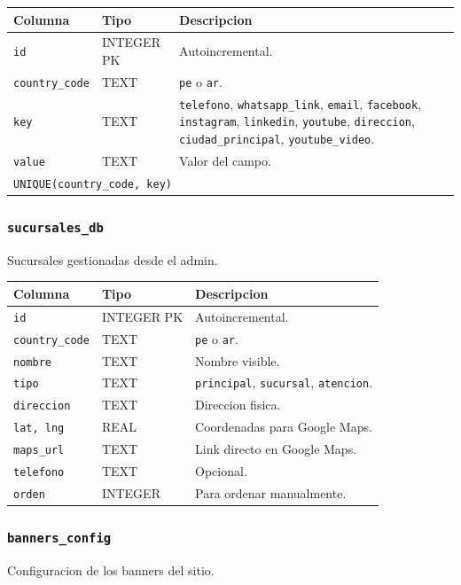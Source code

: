 \documentclass[11pt,a4paper]{article}
\begin{document}
\begin{longtable}{p{3.5cm} p{2cm} p{8cm}}
\toprule
\textbf{Columna} & \textbf{Tipo} & \textbf{Descripcion} \\
\midrule
\endhead
\texttt{id}            & INTEGER PK & Autoincremental. \\
\texttt{country\_code} & TEXT       & \texttt{pe} o \texttt{ar}. \\
\texttt{key}           & TEXT       & \texttt{telefono}, \texttt{whatsapp\_link}, \texttt{email}, \texttt{facebook}, \texttt{instagram}, \texttt{linkedin}, \texttt{youtube}, \texttt{direccion}, \texttt{ciudad\_principal}, \texttt{youtube\_video}. \\
\texttt{value}         & TEXT       & Valor del campo. \\
\multicolumn{3}{l}{\texttt{UNIQUE(country\_code, key)}} \\
\bottomrule
\end{longtable}

\subsubsection{\texttt{sucursales\_db}}
Sucursales gestionadas desde el admin.

\begin{longtable}{p{3.5cm} p{2cm} p{8cm}}
\toprule
\textbf{Columna} & \textbf{Tipo} & \textbf{Descripcion} \\
\midrule
\endhead
\texttt{id}            & INTEGER PK & Autoincremental. \\
\texttt{country\_code} & TEXT       & \texttt{pe} o \texttt{ar}. \\
\texttt{nombre}        & TEXT       & Nombre visible. \\
\texttt{tipo}          & TEXT       & \texttt{principal}, \texttt{sucursal}, \texttt{atencion}. \\
\texttt{direccion}     & TEXT       & Direccion fisica. \\
\texttt{lat, lng}      & REAL       & Coordenadas para Google Maps. \\
\texttt{maps\_url}     & TEXT       & Link directo en Google Maps. \\
\texttt{telefono}      & TEXT       & Opcional. \\
\texttt{orden}         & INTEGER    & Para ordenar manualmente. \\
\bottomrule
\end{longtable}

\subsubsection{\texttt{banners\_config}}
Configuracion de los banners del sitio.
\end{document}
